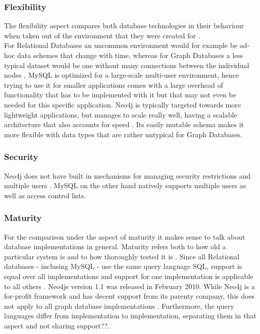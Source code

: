 \subsubsection{Flexibility}
The flexibility aspect compares both database technologies in their behaviour when taken out of the environment that they were created for \cite{Vicknair2010}. \\
For Relational Databases an uncommon environment would for example be ad-hoc data schemes that change with time, whereas for Graph Databases a less typical dataset would be one without many connections between the individual nodes  \cite{GarimaAnalysis}.
MySQL is optimized for a large-scale multi-user environment, hence trying to use it for smaller applications comes with a large overhead of functionality that has to be implemented with it but that may not even be needed for this specific application.
Neo4j is typically targeted towards more lightweight applications, but manages to scale really well, having a scalable architecture that also accounts for speed \cite{neo4jweb}. Its easily mutable schema makes it more flexible with data types that are rather untypical for Graph Databases.

\subsubsection{Security}
Neo4j does not have built in mechanisms for managing security restrictions and multiple users \cite{GarimaAnalysis}. MySQL on the other hand natively supports multiple users as well as access control lists. \cite{mysqlsecurity}

\subsubsection{Maturity}
For the comparison under the aspect of maturity it makes sense to talk about database implementations in general. Maturity refers both to how old a particular system is and to how thoroughly tested it is \cite{Vicknair2010}.
Since all Relational databases - inclusing MySQL - use the same query language SQL, support is equal over all implementations and support for one implementation is applicable to all others \cite{GarimaAnalysis}.
Neo4js version 1.1 was released in February 2010. While Neo4j is a for-profit framework and has decent support from its parenty company, this does not apply to all graph database implementations \cite{Vicknair2010}. Furthermore, the query languages differ from implementation to implementation, separating them in that aspect and not sharing support??.

